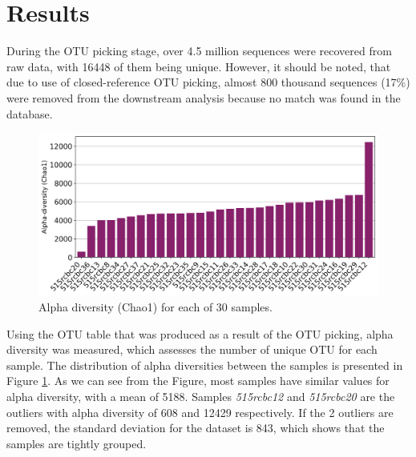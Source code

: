 \documentclass[12pt,twocolumn]{article} %
\begin{document}
\section{Results} 
During the OTU picking stage, over 4.5 million sequences were recovered from raw data, with 16448 of them being unique. However, it should be noted, that due to use of closed-reference OTU picking, almost 800 thousand sequences (17\%) were removed from the downstream analysis because no match was found in the database. 
\begin{figure}[ht!] %
	\includegraphics[width=\linewidth]{chao1_alpha.png}
	\caption{Alpha diversity (Chao1) for each of 30 samples.}
	\label{fig:alpha_diversity}
\end{figure}
\par
Using the OTU table that was produced as a result of the OTU picking, alpha diversity was measured, which assesses the number of unique OTU for each sample. The distribution of alpha diversities between the samples is presented in Figure \ref{fig:alpha_diversity}. As we can see from the Figure, most samples have similar values for alpha diversity, with a mean of 5188. Samples \textit{515rcbc12} and \textit{515rcbc20} are the outliers with alpha diversity of 608 and 12429 respectively. If the 2 outliers are removed, the standard deviation for the dataset is 843, which shows that the samples are tightly grouped.
\end{document}
